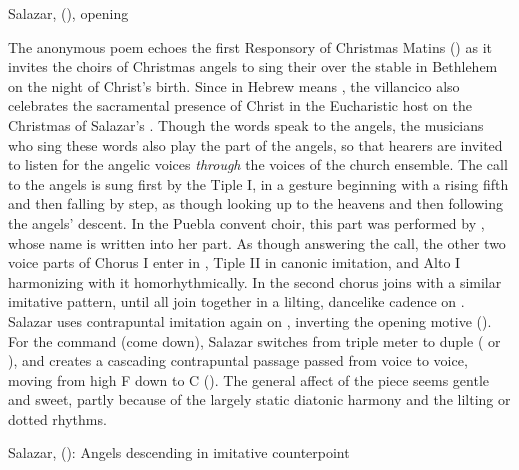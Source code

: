 
{Salazar,  (),
opening}

The anonymous poem echoes the first Responsory of Christmas Matins
() as it invites the choirs of Christmas
angels to sing their  over the stable in Bethlehem on the night
of Christ's birth.
Since  in Hebrew means , the
villancico also celebrates the sacramental presence of Christ in the
Eucharistic host on the Christmas of Salazar's .
Though the words speak to the angels, the musicians who sing these words also
play the part of the angels, so that hearers are invited to listen for the
angelic voices \emph{through} the voices of the church ensemble. 
The call to the angels is sung first by the Tiple I, in a gesture beginning
with a rising fifth and then falling by step, as though looking up to the
heavens and then following the angels' descent.
In the Puebla convent choir, this part was performed by ,
whose name is written into her part.
As though answering the call, the other two voice parts of Chorus I enter in
, Tiple II in canonic imitation, and Alto I harmonizing with it
homorhythmically. 
In  the second chorus joins with a similar imitative
pattern, until all join together in a lilting, dancelike cadence on
.
Salazar uses contrapuntal imitation again on ,
inverting the opening motive ().
For the command  (come down), Salazar switches from \meterCZ{}
triple meter to duple (\meterC{} or ), and creates a cascading
contrapuntal passage passed from voice to voice, moving from high F
down to C ().
The general affect of the piece seems gentle and sweet, partly because of the
largely static diatonic harmony and the lilting or dotted rhythms.


{Salazar,  ():
Angels descending in imitative counterpoint}

